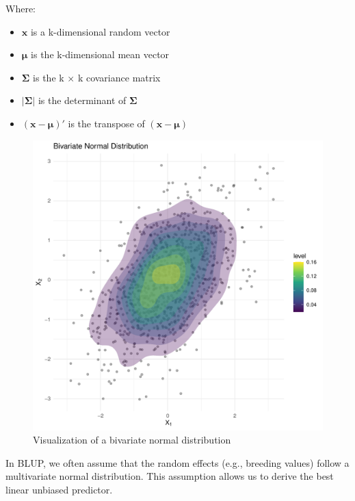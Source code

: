 \documentclass[12pt,a4paper]{article}
\begin{document}
Where:
\begin{itemize}
    \item $\mathbf{x}$ is a k-dimensional random vector
    \item $\boldsymbol{\mu}$ is the k-dimensional mean vector
    \item $\boldsymbol{\Sigma}$ is the k × k covariance matrix
    \item $|\boldsymbol{\Sigma}|$ is the determinant of $\boldsymbol{\Sigma}$
    \item $(\mathbf{x} - \boldsymbol{\mu})'$ is the transpose of $(\mathbf{x} - \boldsymbol{\mu})$
\end{itemize}

\begin{figure}[htbp]
  \centering
  \includegraphics[width=1\textwidth]{multivariate_normal.pdf}
  \caption{Visualization of a bivariate normal distribution}
  \label{fig:multivariate_normal}
\end{figure}

In BLUP, we often assume that the random effects (e.g., breeding values) follow a multivariate normal distribution. This assumption allows us to derive the best  linear unbiased predictor.
\end{document}
